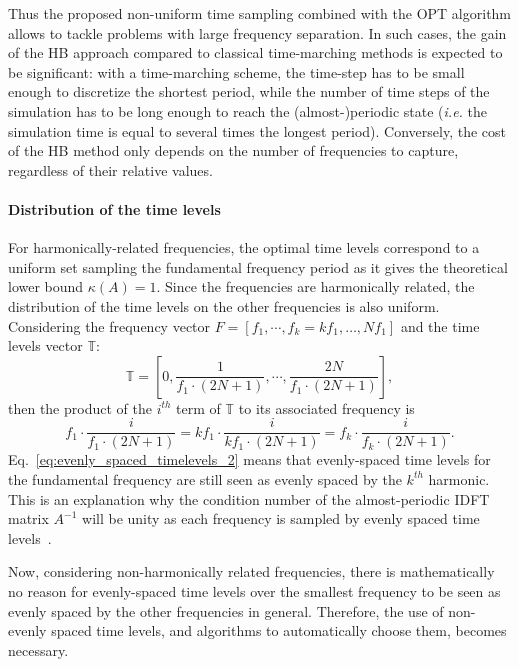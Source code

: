 Thus the proposed non-uniform time sampling combined with the OPT
algorithm allows to tackle problems with large frequency
separation. In such cases, the gain of the HB approach compared
to classical time-marching methods is expected to be significant: with
a time-marching scheme, the time-step has to be small enough to
discretize the shortest period, while the number of time steps of the
simulation has to be long enough to reach the (almost-)periodic state
(\emph{i.e.}  the simulation time is equal to several
times the longest period). Conversely, the cost of the HB method only
depends on the number of frequencies to capture, regardless of their
relative values.

\paragraph{Distribution of the time levels}

For harmonically-related frequencies, the optimal time levels
correspond to a uniform set sampling the fundamental frequency period
as it gives the theoretical lower bound $\kappa (A) = 1$. Since the
frequencies are harmonically related, the distribution of the time
levels on the other frequencies is also uniform. Considering the
frequency vector $F = \left[f_1, \cdots,f_k= kf_1,\ldots,Nf_1 \right]$
and the time levels vector
$\mathbb{T}$:%
\begin{equation}
  \mathbb{T} = \left[0, \frac{1}{f_1\cdot(2N+1)}, \cdots,  \frac{2N}{f_1\cdot(2N+1)} \right],
  \label{eq:evenly_spaced_timelevels}
\end{equation}
then the product of the $i^{th}$ term of $\mathbb{T}$ to its
associated frequency is
\begin{equation}
  f_1 \cdot \frac{i}{f_1\cdot(2N+1)} = k f_1 \cdot \frac{i}{k f_1 \cdot (2N+1)} = f_k \cdot \frac{i}{f_k\cdot(2N+1)}.
  \label{eq:evenly_spaced_timelevels_2}
\end{equation}
Eq.~\eqref{eq:evenly_spaced_timelevels_2} means that evenly-spaced
time levels for the fundamental frequency are still seen as evenly
spaced by the $k^{th}$ harmonic. This is an explanation why the
condition number of the almost-periodic IDFT matrix $A^{-1}$ will be
unity as each frequency is sampled by evenly spaced time
levels~\cite{Brambilla1999}.

Now, considering non-harmonically related frequencies, there is
mathematically no reason for evenly-spaced time levels over the
smallest frequency to be seen as evenly spaced by the other frequencies
in general. Therefore, the use of non-evenly spaced time levels,
  and algorithms to automatically choose them, becomes necessary.

